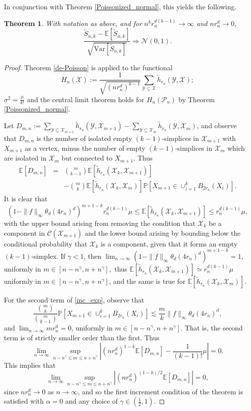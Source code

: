 \documentclass{amsart}
\newtheorem{thm}{Theorem}[section]
\theoremstyle{definition}
\newcommand{\E}{\mathbb{E}}
\newcommand{\X}{\mathcal{X}}
\newcommand{\Y}{\mathcal{Y}}
\renewcommand{\P}{\mathbb{P}}
\newcommand{\var}{\mathrm{Var}}
\newcommand{\s}{\widetilde{S}}
\newcommand{\p}{\mathcal{P}}
\renewcommand{\1}{\mathbb{1}}
\newcommand{\h}{\tilde{h}}
\begin{document}
In conjunction with Theorem \ref{Poissonized_normal}, this yields the following.

\begin{thm}
With notation as above, and for $n^kr_n^{d(k-1)}\to\infty$ and $nr_n^d\to0$,
$$\frac{\s_{n,k}-\E\left[\s_{n,k}\right]}{\sqrt{\var\left[\s_{n,k}\right]}}
\Rightarrow\mathcal{N}(0,1).$$
\end{thm}


\begin{proof}
Theorem \ref{de-Poisson} is applied to the functional  
$$H_n(\X):=\frac{1}{\sqrt{(nr_n^d)^{k-1}}}\sum_{\Y\subseteq\X}\h_{r_n}
(\Y,\X);$$
$\sigma^2=\frac{\mu}{k!}$ and the central limit theorem
holds for $H_n(\p_n)$ by Theorem \ref{Poissonized_normal}.  

Let $D_{m,n}:=\sum_{\Y\subseteq\X_{m+1}}\h_{r_n}(\Y,\X_{m+1})-\sum_{\Y\subseteq\X_m}
\h_{r_n}(\Y,\X_m)$, and observe that $D_{m,n}$
 is the number of isolated empty $(k-1)$-simplices in 
$\X_{m+1}$ with $X_{m+1}$ as a vertex, minus the number of empty $(k-1)$-simplices
in $\X_m$ which are isolated in $\X_m$ but connected to $X_{m+1}$.
Thus
\begin{eqnarray}\label{inc_exp}
\E[D_{m,n}]&=&\binom{m}{k-1}\E[\h_{r_n}(\X_k,\X_{m+1})]\\
&&- \binom{m}{k}\E[\h_{r_n}(\X_k,\X_m)]\P\left[X_{m+1}\in\cup_{i=1}^kB_{2r_n}(X_i)
\right]. \nonumber
\end{eqnarray}
It is clear that 
 $$(1-\|f\|_\infty\theta_d(4r_n)^d)^{m+1-k}r_n^{d(k-1)}\mu\le
\E[\h_{r_n}(\X_k,\X_{m+1})]\le r_n^{d(k-1)}\mu,$$
with the upper bound arising from removing the condition that $\X_k$ be a 
component in $\mathcal{C}(\X_{m+1})$ and the lower bound arising
by bounding below the conditional probability that $\X_k$ is a component, 
given that it forms an empty $(k-1)$-simplex.   If $\gamma<1$, then 
$\lim_{n\to\infty}(1-\|f\|_\infty\theta_d(4r_n)^d)^{m+1-k}=1$, uniformly
in $m\in[n-n^\gamma,n+n^\gamma],$
thus $\E[\h_{r_n}(\X_k,\X_{m+1})]\simeq r_n^{d(k-1)}\mu$ uniformly in 
$m\in[n-n^\gamma,n+n^\gamma]$, and the same is
true for $\E[\h_{r_n}(\X_k,\X_{m})]$.


For the second term of \eqref{inc_exp}, observe that
$$\frac{\binom{m}{k}}{\binom{m}{k-1}}\P\left[X_{m+1}\in\cup_{i=1}^kB_{2r_n}(X_i)
\right]\lesssim\frac{m}{k}\|f\|_\infty\theta_d(4r_n)^d,$$
and $\lim_{n\to\infty}mr_n^d=0$, uniformly in $m\in[n-n^\gamma,n+n^\gamma]$.  
That is, the second term is of strictly
smaller order than the first.  Thus
$$\lim_{n\to\infty}\sup_{n-n^\gamma\le m\le n+n^\gamma}\left|(nr_n^d)^{1-k}\E[D_{m,n}]
-\frac{1}{(k-1)!}\mu\right|=0.$$
This implies that
$$\lim_{n\to\infty}\sup_{n-n^\gamma\le m\le n+n^\gamma}\left|(nr_n^d)^{(1-k)/2}\E[
D_{m,n}]\right|=0,$$
since $nr_n^d\to0$ as $n\to\infty$, and so the first increment condition
of the theorem is satisfied with $\alpha=0$ and any choice of $\gamma\in
(\frac{1}{2},1)$.


\end{proof}
\end{document}
